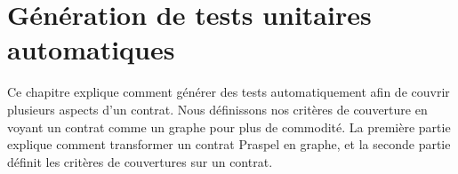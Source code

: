 \chapter{Génération de tests unitaires automatiques}
\label{chapter:tests}

\minitoc

Ce chapitre explique comment générer des tests automatiquement afin de couvrir
plusieurs aspects d'un contrat. Nous définissons nos critères de couverture en
voyant un contrat comme un graphe pour plus de commodité. La première partie
explique comment transformer un contrat Praspel en graphe, et la seconde
partie définit les critères de couvertures sur un contrat.

